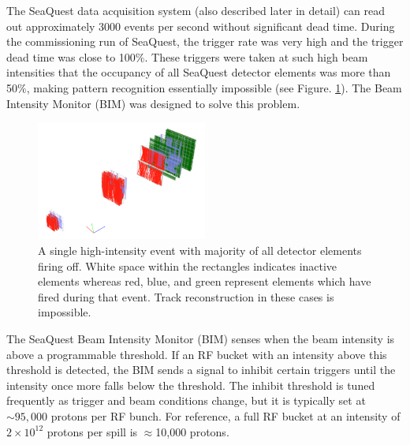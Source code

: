 The SeaQuest data acquisition system (also described later in detail) can read out approximately 3000 events per second without significant dead time.  During the commissioning run of SeaQuest, the trigger rate was very high and the trigger dead time was close to 100\%.  These triggers were taken at such high beam intensities that the occupancy of all SeaQuest detector elements was more than 50$\%$, making pattern recognition essentially impossible (see Figure. \ref{fig:splat}). The Beam Intensity Monitor (BIM) was designed to solve this problem.

\begin{figure}
	\begin{center}
		\includegraphics[width=0.5\textwidth]{figures/apparatus/splat2.png}
		\caption{A single high-intensity event with majority of all detector elements firing off. White space within the rectangles indicates inactive elements whereas red, blue, and green represent elements which have fired during that event. Track reconstruction in these cases is impossible.}
		\label{fig:splat}
	\end{center}
\end{figure}

The SeaQuest Beam Intensity Monitor (BIM) senses when the beam intensity is above a programmable threshold. If an RF bucket with an intensity above this threshold is detected, the BIM sends a signal to inhibit certain triggers until the intensity once more falls below the threshold. The inhibit threshold is tuned frequently as trigger and beam conditions change, but it is typically set at $\sim95,000$ protons per RF bunch. For reference, a full RF bucket at an intensity of $2\times 10^{12}$ protons per spill is $\approx$10,000 protons.

